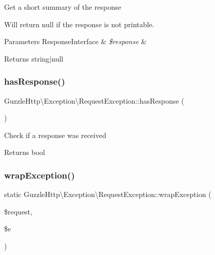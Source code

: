 Get a short summary of the response

Will return {\ttfamily null} if the response is not printable.


\begin{DoxyParams}[1]{Parameters}
Response\+Interface & {\em \$response} & \\
\hline
\end{DoxyParams}
\begin{DoxyReturn}{Returns}
string$\vert$null 
\end{DoxyReturn}
\mbox{\label{classGuzzleHttp_1_1Exception_1_1RequestException_a763f6055c3776ccfdedd1078d7a6ab1b}} 
\subsubsection{\texorpdfstring{has\+Response()}{hasResponse()}}
{\footnotesize\ttfamily Guzzle\+Http\textbackslash{}\+Exception\textbackslash{}\+Request\+Exception\+::has\+Response (\begin{DoxyParamCaption}{ }\end{DoxyParamCaption})}

Check if a response was received

\begin{DoxyReturn}{Returns}
bool 
\end{DoxyReturn}
\mbox{\label{classGuzzleHttp_1_1Exception_1_1RequestException_a8a655eb5c687e8cd40669cca7f69a376}} 
\subsubsection{\texorpdfstring{wrap\+Exception()}{wrapException()}}
{\footnotesize\ttfamily static Guzzle\+Http\textbackslash{}\+Exception\textbackslash{}\+Request\+Exception\+::wrap\+Exception (\begin{DoxyParamCaption}\item[{\hyperlink{interfacePsr_1_1Http_1_1Message_1_1RequestInterface}{Request\+Interface}}]{\$request,  }\item[{\textbackslash{}Exception}]{\$e }\end{DoxyParamCaption})\hspace{0.3cm}{\ttfamily [static]}}

